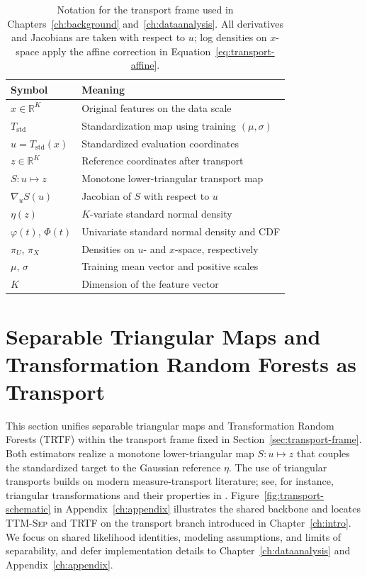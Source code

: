 \documentclass[11pt,a4paper,twoside]{book}\usepackage[]{graphicx}\usepackage[]{xcolor}
\begin{document}
\begin{table}[t]
  \centering
  \caption{Notation for the transport frame used in Chapters~\ref{ch:background} and~\ref{ch:dataanalysis}. All derivatives and Jacobians are taken with respect to $u$; log densities on $x$-space apply the affine correction in Equation~\eqref{eq:transport-affine}.}
  \label{tab:transport-notation}
  \begin{tabular}{ll}
    \hline
    Symbol & Meaning \\ 
    \hline
    $x \in \mathbb{R}^K$ & Original features on the data scale \\ 
    $T_{\mathrm{std}}$ & Standardization map using training $(\mu,\sigma)$ \\ 
    $u = T_{\mathrm{std}}(x)$ & Standardized evaluation coordinates \\ 
    $z \in \mathbb{R}^K$ & Reference coordinates after transport \\ 
    $S:u\mapsto z$ & Monotone lower-triangular transport map \\ 
    $\nabla_u S(u)$ & Jacobian of $S$ with respect to $u$ \\ 
    $\eta(z)$ & $K$-variate standard normal density \\ 
    $\varphi(t)$, $\Phi(t)$ & Univariate standard normal density and CDF \\ 
    $\pi_U$, $\pi_X$ & Densities on $u$- and $x$-space, respectively \\ 
    $\mu$, $\sigma$ & Training mean vector and positive scales \\ 
    $K$ & Dimension of the feature vector \\ 
    \hline
  \end{tabular}
\end{table}

\section{Separable Triangular Maps and Transformation Random Forests as Transport}\label{sec:transport-separable}

This section unifies separable triangular maps and Transformation Random Forests (TRTF) within the transport frame fixed in Section~\ref{sec:transport-frame}. Both estimators realize a monotone lower-triangular map $S:u\mapsto z$ that couples the standardized target to the Gaussian reference $\eta$. The use of triangular transports builds on modern measure-transport literature; see, for instance, triangular transformations and their properties in \citet{bogachev2005triangular}. Figure~\ref{fig:transport-schematic} in Appendix~\ref{ch:appendix} illustrates the shared backbone and locates \textsc{TTM-Sep} and \textsc{TRTF} on the transport branch introduced in Chapter~\ref{ch:intro}. We focus on shared likelihood identities, modeling assumptions, and limits of separability, and defer implementation details to Chapter~\ref{ch:dataanalysis} and Appendix~\ref{ch:appendix}.
\end{document}
